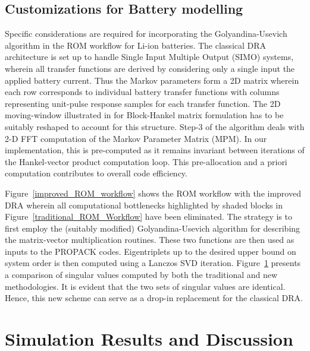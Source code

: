 \subsection{Customizations for Battery modelling}

Specific considerations are required for incorporating the Golyandina-Usevich
algorithm in the ROM workflow for Li-ion batteries. The classical
DRA architecture is set up to handle Single Input Multiple Output
(SIMO) systems, wherein all transfer functions are derived by considering
only a single input \textendash{} the applied battery current. Thus
the Markov parameters form a 2D matrix wherein each row corresponds
to individual battery transfer functions with columns representing
unit-pulse response samples for each transfer function. The 2D moving-window
illustrated in \citep{GolyandinaKorobeynikovShlemovEtAl2015} for
Block-Hankel matrix formulation has to be suitably reshaped to account
for this structure. Step-3 of the algorithm deals with 2-D FFT computation
of the Markov Parameter Matrix (MPM). In our implementation, this
is pre-computed as it remains invariant between iterations of the
Hankel-vector product computation loop. This pre-allocation and a
priori computation contributes to overall code efficiency.

Figure~\ref{improved_ROM_workflow} shows the ROM workflow with
the improved DRA wherein all computational bottlenecks highlighted
by shaded blocks in Figure~\ref{traditional_ROM_Workflow} have
been eliminated. The strategy is to first employ the (suitably modified)
Golyandina-Usevich algorithm for describing the matrix-vector multiplication
routines. These two functions are then used as inputs to the PROPACK
codes. Eigentriplets up to the desired upper bound on system order
is then computed using a Lanczos SVD iteration. Figure~\ref{svdcompare}
presents a comparison of singular values computed by both the  traditional
and new methodologies. It is evident that the two sets of singular
values are identical. Hence, this new scheme can serve as a drop-in
replacement for the classical DRA.

\begin{figure}
	\caption{}
	\label{svdcompare}
\end{figure}

\section{Simulation Results and Discussion\label{sec:Results} }

